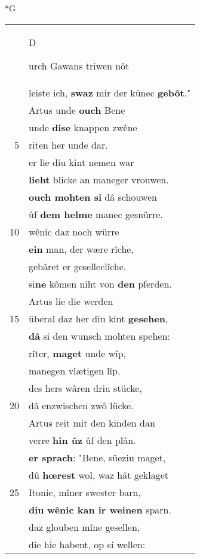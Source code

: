 \documentclass[8pt,a4paper,notitlepage]{article}
\begin{document}
\begin{table}[ht]
\begin{minipage}[t]{0.5\linewidth}
\small
\begin{center}*G
\end{center}
\begin{tabular}{rl}
 & \begin{large}D\end{large}urch Gawans triwen nôt\\ 
 & leiste ich, \textbf{swaz} mir der künec \textbf{gebôt}."\\ 
 & Artus unde \textbf{ouch} Bene\\ 
 & unde \textbf{dise} knappen zwêne\\ 
5 & riten her unde dar.\\ 
 & er lie diu kint nemen war\\ 
 & \textbf{lieht} blicke an maneger vrouwen.\\ 
 & \textbf{ouch mohten si} dâ schouwen\\ 
 & ûf \textbf{dem helme} manec gesnürre.\\ 
10 & wênic daz noch würre\\ 
 & \textbf{ein} man, der wære rîche,\\ 
 & gebâret er geselleclîche.\\ 
 & si\textbf{ne} kômen niht von \textbf{den} pferden.\\ 
 & Artus lie die werden\\ 
15 & überal daz her diu kint \textbf{gesehen},\\ 
 & \textbf{dâ} si den wunsch mohten spehen:\\ 
 & rîter, \textbf{maget} unde wîp,\\ 
 & manegen vlætigen lîp.\\ 
 & des hers wâren driu stücke,\\ 
20 & dâ enzwischen zwô lücke.\\ 
 & Artus reit mit den kinden dan\\ 
 & verre \textbf{hin ûz} ûf den plân.\\ 
 & \textbf{er sprach}: "Bene, süeziu maget,\\ 
 & dû \textbf{hœrest} wol, waz hât geklaget\\ 
25 & Itonie, mîner swester barn,\\ 
 & \textbf{diu} \textbf{wênic kan ir weinen} sparn.\\ 
 & daz glouben mîne gesellen,\\ 
 & die hie habent, op si wellen:\\ 

\end{tabular}
\end{minipage}
\end{table}
\end{document}
